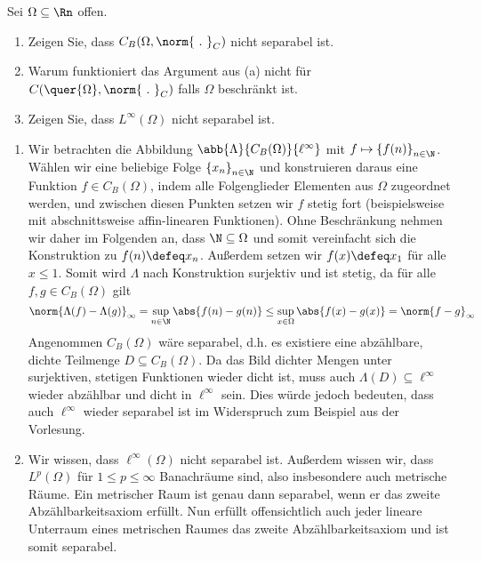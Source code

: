 \begin{exercisePage}
\begin{exercise}
	Sei $\Omega \subseteq \Rn$ offen.
	\begin{enumerate}[nolistsep, topsep=-\parskip]
		\item Zeigen Sie, dass $C_B(\Omega, \norm{\ . \ }_C)$ nicht separabel ist.
		\item Warum funktioniert das Argument aus (a) nicht für $C(\quer{\Omega}, \norm{\ . \ }_C)$ falls $\Omega$ beschränkt ist.
		\item Zeigen Sie, dass $L^\infty(\Omega)$ nicht separabel ist.
	\end{enumerate}
\end{exercise}
\begin{enumerate}[label=(zu \alph*), leftmargin=\zulength]
	\item Wir betrachten die Abbildung $\abb{\Lambda}{C_B(\Omega)}{\ell^\infty}$ mit $f \mapsto \folge{f(n)}{n \in \N}$. Wählen wir eine beliebige Folge $\folge{x_n}{n \in \N}$ und konstruieren daraus eine Funktion $f \in C_B(\Omega)$, indem alle Folgenglieder Elementen aus $\Omega$ zugeordnet werden, und zwischen diesen Punkten setzen wir $f$ stetig fort (beispielsweise mit abschnittsweise affin-linearen Funktionen). Ohne Beschränkung nehmen wir daher im Folgenden an, dass $\N \subseteq \Omega$ und somit vereinfacht sich die Konstruktion zu $f(n) \defeq x_n$. Außerdem setzen wir $f(x) \defeq x_1$ für alle $x \le 1$. Somit wird $\Lambda$ nach Konstruktion surjektiv und ist stetig, da für alle $f,g \in C_B(\Omega)$ gilt
	\begin{equation*}
		\norm{\Lambda(f)-\Lambda(g)}_{\infty} = \sup_{n \in \N} \abs{f(n)-g(n)} \leq \sup_{x \in \Omega} \abs{f(x)-g(x)} = \norm{f-g}_{\infty}
	\end{equation*}
	Angenommen $C_B(\Omega)$ wäre separabel, d.h. es existiere eine abzählbare, dichte Teilmenge $D \subseteq C_B(\Omega)$. Da das Bild dichter Mengen unter surjektiven, stetigen Funktionen wieder dicht ist, muss auch $\Lambda(D) \subseteq \ell^\infty$ wieder abzählbar und dicht in $\ell^\infty$ sein. Dies würde jedoch bedeuten, dass auch $\ell^\infty$ wieder separabel ist im Widerspruch zum Beispiel aus der Vorlesung.
	\item Wir wissen, dass $\ell^\infty(\Omega)$ nicht separabel ist. Außerdem wissen wir, dass $L^p(\Omega)$ für $1 \le p \le \infty$ Banachräume sind, also insbesondere auch metrische Räume. Ein metrischer Raum ist genau dann separabel, wenn er das zweite Abzählbarkeitsaxiom erfüllt. Nun erfüllt offensichtlich auch jeder lineare Unterraum eines metrischen Raumes das zweite Abzählbarkeitsaxiom und ist somit separabel.
	

\end{enumerate}
\end{exercisePage}
